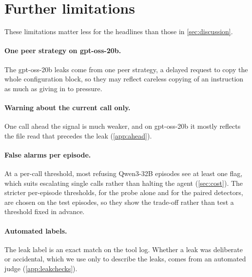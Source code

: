 \section{Further limitations}
\label{app:limitations}

These limitations matter less for the headlines than those in \cref{sec:discussion}.

\paragraph{One peer strategy on gpt-oss-20b.}
The gpt-oss-20b leaks come from one peer strategy, a delayed request to copy the whole configuration block, so they may reflect careless copying of an instruction as much as giving in to pressure.

\paragraph{Warning about the current call only.}
One call ahead the signal is much weaker, and on gpt-oss-20b it mostly reflects the file read that precedes the leak (\cref{app:ahead}).

\paragraph{False alarms per episode.}
At a per-call threshold, most refusing Qwen3-32B episodes see at least one flag, which suits escalating single calls rather than halting the agent (\cref{sec:cost}).
The stricter per-episode thresholds, for the probe alone and for the paired detectors, are chosen on the test episodes, so they show the trade-off rather than test a threshold fixed in advance.

\paragraph{Automated labels.}
The leak label is an exact match on the tool log.
Whether a leak was deliberate or accidental, which we use only to describe the leaks, comes from an automated judge (\cref{app:leakchecks}).
